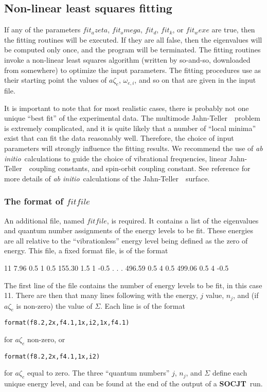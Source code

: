 \documentclass{article}
\newcommand{\ai}{{\it ab initio}}
\newcommand{\JT}{Jahn-Teller\ }
\newcommand{\socjt}{{\bf SOCJT}}
\begin{document}
\subsection{Non-linear least squares fitting} \label{section:fitting}

If any of the parameters $fit_azeta$, $fit_omega$, $fit_d$, $fit_k$,
or $fit_wexe$ are true, then the fitting routines will be executed. If
they are all false, then the eigenvalues will be computed only once,
and the program will be terminated. The fitting routines invoke a
non-linear least squares algorithm (written by so-and-so, downloaded
from somewhere) to optimize the input parameters. The fitting
procedures use as their starting point the values of $a\zeta _e$,
$\omega _{e,i}$, and so on that are given in the input file.

It is important to note that for most realistic cases, there is
probably not one unique ``best fit'' of the experimental data. The
multimode \JT\ problem is extremely complicated, and it is quite
likely that a number of ``local minima'' exist that can fit the data
reasonably well. Therefore, the choice of input parameters will
strongly influence the fitting results. We recommend the use of \ai\
calculations to guide the choice of vibrational frequencies, linear
\JT\ coupling constants, and spin-orbit coupling constant. See
reference  for more details of \ai\ calculations of the
\JT\ surface.

\subsubsection{The format of $fitfile$} \label{section:fitting:file}

An additional file, named $fitfile$, is required. It contains a list
of the eigenvalues and quantum number assignments of the energy levels to
be fit. These energies are all relative to the ``vibrationless''
energy level being defined as the zero of energy. This file, a fixed
format file, is of the format 
\begin{verbatim*}
11
    7.96   0.5  1  0.5
  155.30   1.5  1 -0.5
.
.
.
  496.59   0.5  4  0.5
  499.06   0.5  4 -0.5  
\end{verbatim*}
The first line of the file contains the number of energy levels to be
fit, in this case 11.  There are then that many lines following with
the energy, $j$ value, $n_j$, and (if $a\zeta _e $ is non-zero) the
value of $\Sigma $.  Each line is of the format
\begin{verbatim}
format(f8.2,2x,f4.1,1x,i2,1x,f4.1)
\end{verbatim}
for $a\zeta _e$ non-zero, or
\begin{verbatim}
format(f8.2,2x,f4.1,1x,i2)
\end{verbatim}
for $a\zeta _e$ equal to zero.  The three ``quantum numbers'' $j$,
$n_j$, and $\Sigma $ define each unique energy level, and can be found
at the end of the output of a \socjt\ run.




\end{document}
